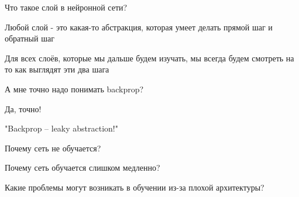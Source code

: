 \documentclass[notes,12pt, aspectratio=169]{beamer}
\newenvironment{wideitemize}{\itemize\addtolength{\itemsep}{10pt}}{\enditemize}
\begin{document}
\begin{frame}{Что такое слой в нейронной сети?}
	\begin{wideitemize}
		\item Любой слой - это какая-то абстракция, которая умеет делать прямой шаг и обратный шаг
	
		\item Для всех слоёв, которые мы дальше будем изучать, мы всегда будем смотреть на то как выглядят эти два шага
	\end{wideitemize}
\end{frame}


\begin{frame}{А мне точно надо понимать backprop?}
	\begin{wideitemize}
		\item  \alert{Да, точно!} 
				
		\item  "Backprop – leaky abstraction!"
		
		\item  Почему сеть не обучается?
		
		\item  Почему сеть обучается слишком медленно? 
		
		\item  Какие проблемы могут возникать в обучении из-за плохой архитектуры? 
	\end{wideitemize}
\end{frame}
\end{document}
